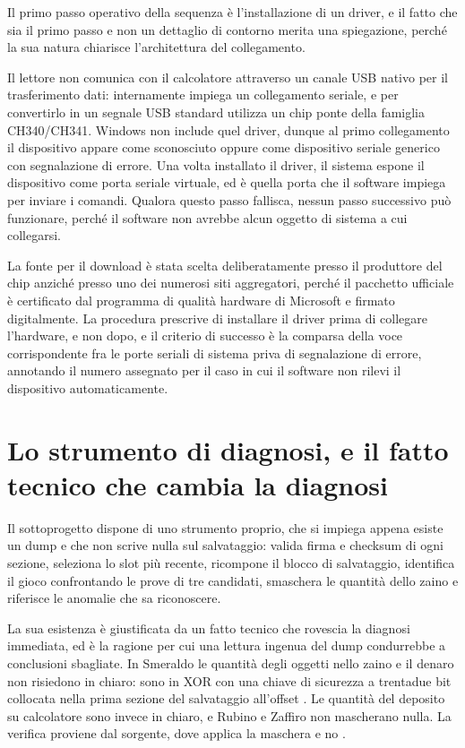 Il primo passo operativo della sequenza è l'installazione di un driver, e il fatto che sia il primo passo e non un dettaglio di contorno merita una spiegazione, perché la sua natura chiarisce l'architettura del collegamento.

Il lettore non comunica con il calcolatore attraverso un canale USB nativo per il trasferimento dati: internamente impiega un collegamento seriale, e per convertirlo in un segnale USB standard utilizza un chip ponte della famiglia CH340/CH341. Windows non include quel driver, dunque al primo collegamento il dispositivo appare come sconosciuto oppure come dispositivo seriale generico con segnalazione di errore. Una volta installato il driver, il sistema espone il dispositivo come porta seriale virtuale, ed è quella porta che il software impiega per inviare i comandi. Qualora questo passo fallisca, nessun passo successivo può funzionare, perché il software non avrebbe alcun oggetto di sistema a cui collegarsi.

La fonte per il download è stata scelta deliberatamente presso il produttore del chip anziché presso uno dei numerosi siti aggregatori, perché il pacchetto ufficiale è certificato dal programma di qualità hardware di Microsoft e firmato digitalmente. La procedura prescrive di installare il driver prima di collegare l'hardware, e non dopo, e il criterio di successo è la comparsa della voce corrispondente fra le porte seriali di sistema priva di segnalazione di errore, annotando il numero assegnato per il caso in cui il software non rilevi il dispositivo automaticamente.

\section{Lo strumento di diagnosi, e il fatto tecnico che cambia la diagnosi}

Il sottoprogetto dispone di uno strumento proprio, che si impiega appena esiste un dump e che non scrive nulla sul salvataggio: valida firma e checksum di ogni sezione, seleziona lo slot più recente, ricompone il blocco di salvataggio, identifica il gioco confrontando le prove di tre candidati, smaschera le quantità dello zaino e riferisce le anomalie che sa riconoscere.

La sua esistenza è giustificata da un fatto tecnico che rovescia la diagnosi immediata, ed è la ragione per cui una lettura ingenua del dump condurrebbe a conclusioni sbagliate. In Smeraldo le quantità degli oggetti nello zaino e il denaro non risiedono in chiaro: sono in XOR con una chiave di sicurezza a trentadue bit collocata nella prima sezione del salvataggio all'offset . Le quantità del deposito su calcolatore sono invece in chiaro, e Rubino e Zaffiro non mascherano nulla. La verifica proviene dal sorgente, dove  applica la maschera e  no \cite{pokeemerald}.

